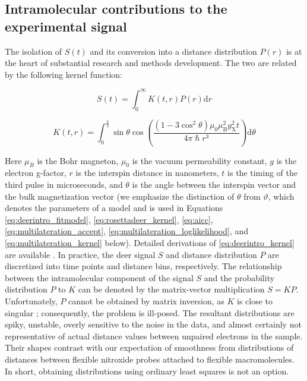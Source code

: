 \subsection{Intramolecular contributions to the experimental signal}

The isolation of $S(t)$ and its conversion into a distance distribution $P(r)$ is at the heart of substantial research and methods development. The two are related by the following kernel function:

\begin{equation}
    S \left( t \right) = \int_{0}^{\infty} K \left( t, r \right) P \left( r \right) \mathup{d}r
\end{equation}

\begin{equation}
    K \left( t, r \right) = \int_{0}^{\frac{ \pi}{2}} \sin \theta \cos \left( \frac{ \left( 1 - 3 \cos^{2} \theta \right) \mu_0 \mu_{\mathup{B}}^{2} g_{\mathup{X}}^{2} t }{ 4 \pi \hslash r^{3} }  \right) \mathup{d} \theta
\label{eq:deerintro_kernel}
\end{equation}

Here $μ_B$ is the Bohr magneton, $μ_0$ is the vacuum permeability constant, $g$ is the electron g-factor, $r$ is the interspin distance in nanometers, $t$ is the timing of the third pulse in microseconds, and $\theta$ is the angle between the interspin vector and the bulk magnetization vector (we emphasize the distinction of $\theta$ from $\vartheta$, which denotes the parameters of a model and is used in Equations \ref{eq:deerintro_fitmodel}, \ref{eq:rosettadeer_kernel}, \ref{eq:aicc}, \ref{eq:multilateration_accept}, \ref{eq:multilateration_loglikelihood}, and \ref{eq:multilateration_kernel} below). Detailed derivations of \ref{eq:deerintro_kernel} are available \citep*{Worswick2018}. In practice, the \gls{deer} signal $S$ and distance distribution $P$ are discretized into time points and distance bins, respectively. The relationship between the intramolecular component of the signal $S$ and the probability distribution $P$ to $K$ can be denoted by the matrix-vector multiplication $S=KP$. Unfortunately, $P$ cannot be obtained by matrix inversion, as $K$ is close to singular \citep*{Edwards2016, FabregasIbanez2019}; consequently, the problem is ill-posed. The resultant distributions are spiky, unstable, overly sensitive to the noise in the data, and almost certainly not representative of actual distance values between unpaired electrons in the sample. Their shapes contrast with our expectation of smoothness from distributions of distances between flexible nitroxide probes attached to flexible macromolecules. In short, obtaining distributions using ordinary least squares is not an option.


